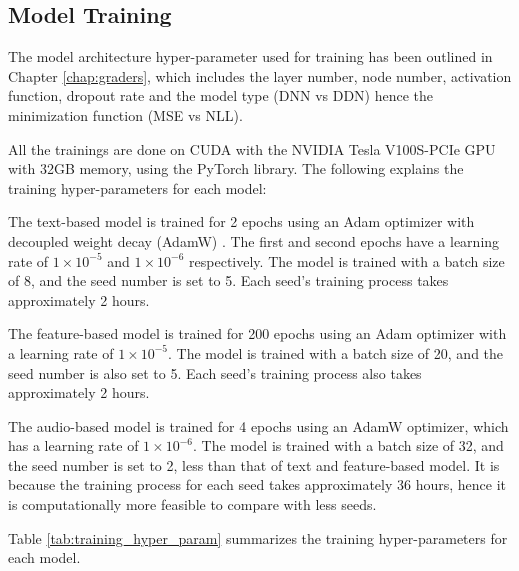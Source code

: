 \subsection{Model Training}
The model architecture hyper-parameter used for training has been outlined in Chapter \ref{chap:graders}, which includes the layer number, node number, activation function, dropout rate and the model type (DNN vs DDN) hence the minimization function (MSE vs NLL).

All the trainings are done on CUDA with the NVIDIA Tesla V100S-PCIe GPU with 32GB memory, using the PyTorch library. The following explains the training hyper-parameters for each model:

The text-based model is trained for 2 epochs using an Adam optimizer with decoupled weight decay (AdamW) . The first and second epochs have a learning rate of $1 \times 10^{-5}$ and $1 \times 10^{-6}$ respectively. The model is trained with a batch size of 8, and the seed number is set to 5. Each seed's training process takes approximately 2 hours.

The feature-based model is trained for 200 epochs using an Adam optimizer with a learning rate of $1 \times 10^{-5}$. The model is trained with a batch size of 20, and the seed number is also set to 5. Each seed's training process also takes approximately 2 hours.

The audio-based model is trained for 4 epochs using an AdamW optimizer, which has a learning rate of $1 \times 10^{-6}$. The model is trained with a batch size of 32, and the seed number is set to 2, less than that of text and feature-based model. It is because the training process for each seed takes approximately 36 hours, hence it is computationally more feasible to compare with less seeds.


Table \ref{tab:training_hyper_param} summarizes the training hyper-parameters for each model.

